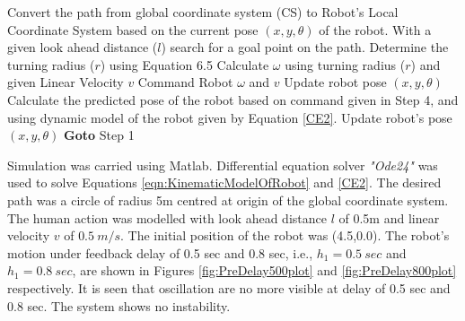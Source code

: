 \begin{algorithmic}[1]
	\State Convert the path from global coordinate system (CS) to Robot's Local Coordinate System based on the  current pose  $(x,y,\theta)$ of the robot.
	\State With a given look ahead distance ($l$) search for a goal point on the path.
	\State Determine the turning radius ($r$) using Equation 6.5 
	\State Calculate $\omega$ using turning radius ($r$) and given Linear Velocity $v$
	\State Command Robot $\omega$ and  $v$
		\State Update robot pose $(x,y,\theta)$
	\Else
		\State Calculate the predicted pose of the robot  based on command given in Step 4, and using dynamic model of the robot given by Equation \ref{CE2}.
		\State Update robot's pose $(x,y,\theta)$ 
	\EndIf
	\State\textbf{ Goto} Step 1
\end{algorithmic}	
 Simulation was carried using Matlab. Differential equation solver \textit{"Ode24"} was used to solve Equations \ref{eqn:KinematicModelOfRobot} and \ref{CE2}.  The desired path  was a circle of radius 5m centred at origin of the global coordinate system. The human action was modelled with look ahead distance $l$ of 0.5m and linear velocity $v$ of $0.5~m/s$. The initial position of the robot was (4.5,0.0). 
 The  robot's motion  under feedback delay of 0.5 sec and 0.8 sec, i.e.,  $h_1=0.5~sec$ and $h_1=0.8~sec$,  are shown in  Figures \ref{fig:PreDelay500plot} and \ref{fig:PreDelay800plot} respectively.   It is seen that oscillation are no more visible at delay of 0.5 sec  and   0.8 sec. The system shows no instability. 

